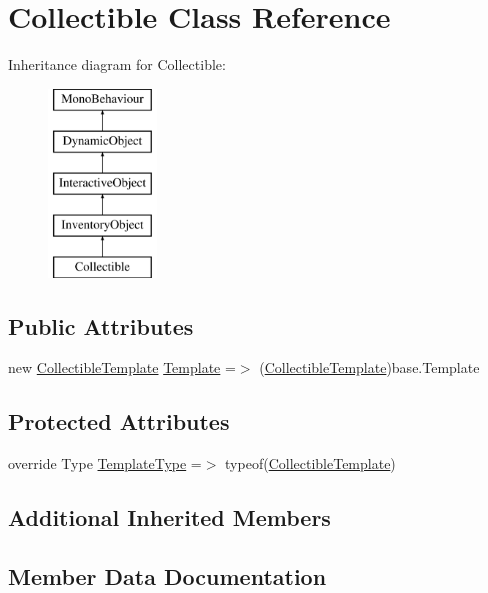 \hypertarget{class_collectible}{}\section{Collectible Class Reference}
\label{class_collectible}
Inheritance diagram for Collectible\+:\begin{figure}[H]
\begin{center}
\leavevmode
\includegraphics[height=5.000000cm]{class_collectible}
\end{center}
\end{figure}
\subsection*{Public Attributes}
\begin{DoxyCompactItemize}
\item 
new \mbox{\hyperlink{class_collectible_template}{Collectible\+Template}} \mbox{\hyperlink{class_collectible_a6a7204d3b6c89cdf360fa49a8024a8b2}{Template}} =$>$ (\mbox{\hyperlink{class_collectible_template}{Collectible\+Template}})base.\+Template
\end{DoxyCompactItemize}
\subsection*{Protected Attributes}
\begin{DoxyCompactItemize}
\item 
override Type \mbox{\hyperlink{class_collectible_a1060dabdae062fea8758da67704429b7}{Template\+Type}} =$>$ typeof(\mbox{\hyperlink{class_collectible_template}{Collectible\+Template}})
\end{DoxyCompactItemize}
\subsection*{Additional Inherited Members}


\subsection{Member Data Documentation}
\mbox{\label{class_collectible_a6a7204d3b6c89cdf360fa49a8024a8b2}} 
